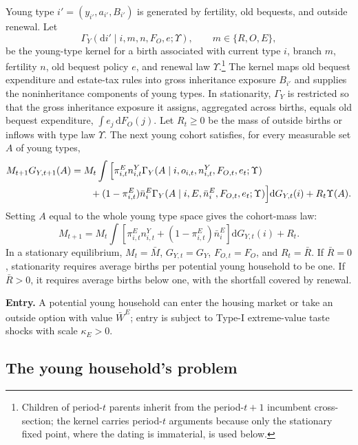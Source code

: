 \documentclass[11pt]{article}
\newcommand{\dd}{\mathrm d}
\newcommand{\1}{\mathbf 1}
\begin{document}
Young type $i'=(y_{i'},a_{i'},B_{i'})$ is generated by fertility, old bequests, and outside renewal. Let
\[
\Gamma_Y(\dd i'\mid i,m,n,F_O,e;\Upsilon),
\qquad m\in\{R,O,E\},
\]
be the young-type kernel for a birth associated with current type $i$, branch $m$, fertility $n$, old bequest policy $e$, and renewal law $\Upsilon$.\footnote{Children of period-$t$ parents inherit from the period-$t+1$ incumbent cross-section; the kernel carries period-$t$ arguments because only the stationary fixed point, where the dating is immaterial, is used below.} The kernel maps old bequest expenditure and estate-tax rules into gross inheritance exposure $B_{i'}$ and supplies the noninheritance components of young types. In stationarity, $\Gamma_Y$ is restricted so that the gross inheritance exposure it assigns, aggregated across births, equals old bequest expenditure, $\int e_j\,\dd F_O(j)$. Let $R_t\ge0$ be the mass of outside births or inflows with type law $\Upsilon$. The next young cohort satisfies, for every measurable set $A$ of young types,
\begin{align}
M_{t+1}G_{Y,t+1}(A)
&=
M_t\int
\Big[
\pi_{i,t}^E n_{i,t}^{Y}
\Gamma_Y(A\mid i,o_{i,t},n_{i,t}^{Y},F_{O,t},e_t;\Upsilon)
\notag\\
&\qquad
+(1-\pi_{i,t}^E)\bar n_i^E
\Gamma_Y(A\mid i,E,\bar n_i^E,F_{O,t},e_t;\Upsilon)
\Big]\dd G_{Y,t}(i)
+
R_t\Upsilon(A).
\label{eq:compact_young_transition}
\end{align}
Setting $A$ equal to the whole young type space gives the cohort-mass law:
\begin{equation}
M_{t+1}
=
M_t\int
\left[
\pi_{i,t}^E n_{i,t}^{Y}
+(1-\pi_{i,t}^E)\bar n_i^E
\right]
\dd G_{Y,t}(i)
+R_t.
\label{eq:compact_cohort_mass_law}
\end{equation}
In a stationary equilibrium, $M_t=\bar M$, $G_{Y,t}=G_Y$, $F_{O,t}=F_O$, and $R_t=\bar R$. If $\bar R=0$, stationarity requires average births per potential young household to be one. If $\bar R>0$, it requires average births below one, with the shortfall covered by renewal.

\textbf{Entry.} A potential young household can enter the housing market or take an outside option with value $\bar W^E$; entry is subject to Type-I extreme-value taste shocks with scale $\kappa_E>0$.

\subsection{The young household's problem}
\end{document}
